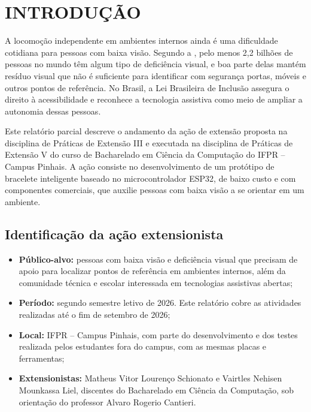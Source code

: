 \chapter{INTRODUÇÃO}
\label{cap:introducao}

A locomoção independente em ambientes internos ainda é uma dificuldade cotidiana para pessoas com baixa visão. Segundo a , pelo menos 2,2 bilhões de pessoas no mundo têm algum tipo de deficiência visual, e boa parte delas mantém resíduo visual que não é suficiente para identificar com segurança portas, móveis e outros pontos de referência. No Brasil, a Lei Brasileira de Inclusão \cite{brasil2015lbi} assegura o direito à acessibilidade e reconhece a tecnologia assistiva como meio de ampliar a autonomia dessas pessoas.

Este relatório parcial descreve o andamento da ação de extensão proposta na disciplina de Práticas de Extensão III e executada na disciplina de Práticas de Extensão V do curso de Bacharelado em Ciência da Computação do IFPR -- Campus Pinhais. A ação consiste no desenvolvimento de um protótipo de bracelete inteligente baseado no microcontrolador ESP32, de baixo custo e com componentes comerciais, que auxilie pessoas com baixa visão a se orientar em um ambiente.

\section{Identificação da ação extensionista}
\label{sec:identificacao}

\begin{itemize}
    \item \textbf{Público-alvo:} pessoas com baixa visão e deficiência visual que precisam de apoio para localizar pontos de referência em ambientes internos, além da comunidade técnica e escolar interessada em tecnologias assistivas abertas;
    \item \textbf{Período:} segundo semestre letivo de 2026. Este relatório cobre as atividades realizadas até o fim de setembro de 2026;
    \item \textbf{Local:} IFPR -- Campus Pinhais, com parte do desenvolvimento e dos testes realizada pelos estudantes fora do campus, com as mesmas placas e ferramentas;
    \item \textbf{Extensionistas:} Matheus Vitor Lourenço Schionato e Vairtles Nehisen Mounkassa Liel, discentes do Bacharelado em Ciência da Computação, sob orientação do professor Alvaro Rogerio Cantieri.
\end{itemize}

